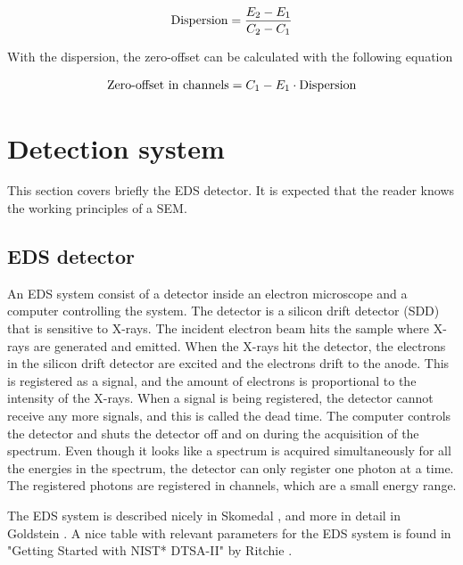 \begin{equation}
    \label{eq:theory:calibration:dispersion}
    \textnormal{Dispersion} = \frac{E_2 - E_1}{C_2 - C_1}
\end{equation}

With the dispersion, the zero-offset can be calculated with the following equation

\begin{equation}
    \label{eq:theory:calibration:offset}
    \textnormal{Zero-offset in channels} = C_1 - E_1 \cdot \textnormal{Dispersion}
\end{equation}














\section{Detection system}
\label{sec:theory:detectionsystem}

This section covers briefly the EDS detector.
It is expected that the reader knows the working principles of a SEM.


\subsection{EDS detector}
\label{sec:theory:edsdetector}

An EDS system consist of a detector inside an electron microscope and a computer controlling the system.
The detector is a silicon drift detector (SDD) that is sensitive to X-rays.
The incident electron beam hits the sample where X-rays are generated and emitted.
When the X-rays hit the detector, the electrons in the silicon drift detector are excited and the electrons drift to the anode.
This is registered as a signal, and the amount of electrons is proportional to the intensity of the X-rays.
When a signal is being registered, the detector cannot receive any more signals, and this is called the dead time.
The computer controls the detector and shuts the detector off and on during the acquisition of the spectrum.
Even though it looks like a spectrum is acquired simultaneously for all the energies in the spectrum, the detector can only register one photon at a time.
The registered photons are registered in channels, which are a small energy range.

The EDS system is described nicely in Skomedal \cite{skomedal_improving_2022}, and more in detail in Goldstein \cite{goldstein_scanning_2018}.
A nice table with relevant parameters for the EDS system is found in "Getting Started with NIST* DTSA-II" by Ritchie \cite{NIST-DTSA-II}.

